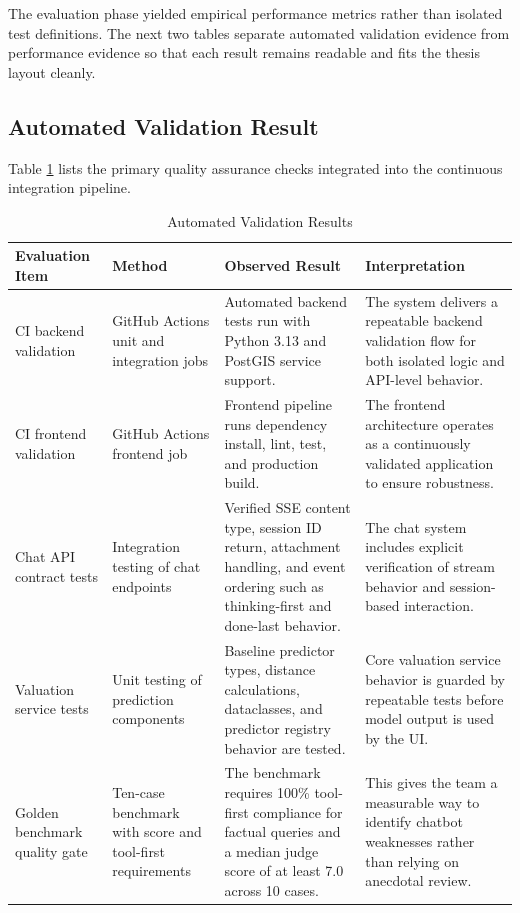 The evaluation phase yielded empirical performance metrics rather than isolated test definitions. The next two tables separate automated validation evidence from performance evidence so that each result remains readable and fits the thesis layout cleanly.

\subsection{Automated Validation Result}

Table \ref{tab:chapter7-automated-testing-results} lists the primary quality assurance checks integrated into the continuous integration pipeline.

\begin{table}[htbp]
    \centering
    \small
    \renewcommand{\arraystretch}{1.25}
    \begin{tabularx}{\textwidth}{>{\raggedright\arraybackslash}p{}>{\raggedright\arraybackslash}p{}>{\raggedright\arraybackslash}p{}>{\raggedright\arraybackslash}X}
        \toprule
        \rowcolor[gray]{0.9} \textbf{Evaluation Item} & \textbf{Method} & \textbf{Observed Result} & \textbf{Interpretation} \\
        \midrule
        CI backend validation & GitHub Actions unit and integration jobs & Automated backend tests run with Python 3.13 and PostGIS service support. & The system delivers a repeatable backend validation flow for both isolated logic and API-level behavior. \\
        CI frontend validation & GitHub Actions frontend job & Frontend pipeline runs dependency install, lint, test, and production build. & The frontend architecture operates as a continuously validated application to ensure robustness. \\
        Chat API contract tests & Integration testing of chat endpoints & Verified SSE content type, session ID return, attachment handling, and event ordering such as thinking-first and done-last behavior. & The chat system includes explicit verification of stream behavior and session-based interaction. \\
        Valuation service tests & Unit testing of prediction components & Baseline predictor types, distance calculations, dataclasses, and predictor registry behavior are tested. & Core valuation service behavior is guarded by repeatable tests before model output is used by the UI. \\
        Golden benchmark quality gate & Ten-case benchmark with score and tool-first requirements & The benchmark requires 100\% tool-first compliance for factual queries and a median judge score of at least 7.0 across 10 cases. & This gives the team a measurable way to identify chatbot weaknesses rather than relying on anecdotal review. \\
        \bottomrule
    \end{tabularx}
    \caption{Automated Validation Results}
    \label{tab:chapter7-automated-testing-results}
\end{table}

